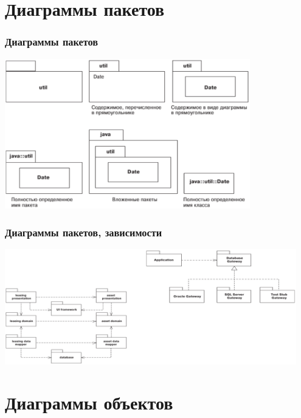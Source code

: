 \documentclass{../../slides-style}
\begin{document}
    \section{Диаграммы пакетов}

    \begin{frame}
        \frametitle{Диаграммы пакетов}
        \begin{center}
            \includegraphics[width=0.8\textwidth]{packageDiagrams.png}
        \end{center}
    \end{frame}

    \begin{frame}
        \frametitle{Диаграммы пакетов, зависимости}
        \begin{center}
            \includegraphics[width=0.95\textwidth]{packageDependencies.png}
        \end{center}
    \end{frame}

    \section{Диаграммы объектов}
\end{document}

